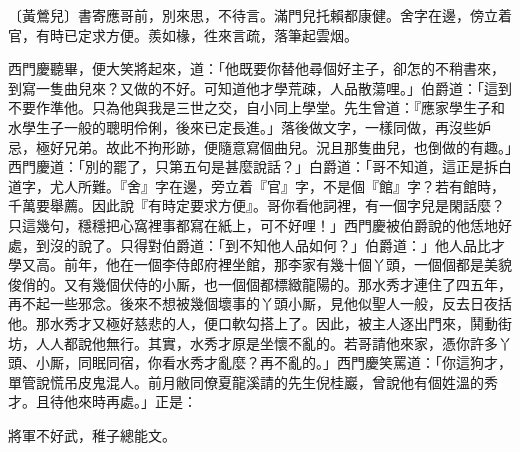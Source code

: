 \begin{myquote}
{\markfont\small〔黃鶯兒〕}書寄應哥前，別來思，不待言。滿門兒托賴都康健。舍字在邊，傍立着官，有時已定求方便。羨如椽，徃來言疏，落筆起雲烟。
\end{myquote}

西門慶聽畢，便大笑將起來，道：「他既要你替他尋個好主子，卻怎的不稍書來，到寫一隻曲兒來？又做的不好。可知道他才學荒疎，人品散蕩哩。」伯爵道：「這到不要作準他。只為他與我是三世之交，自小同上學堂。先生曾道：『應家學生子和水學生子一般的聰明伶俐，後來已定長進。」落後做文字，一樣同做，再沒些妒忌，極好兄弟。故此不拘形跡，{}便隨意寫個曲兒。況且那隻曲兒，也倒做的有趣。」西門慶道：「別的罷了，只第五句是甚麼說話？」白爵道：「哥不知道，這正是拆白道字，尤人所難。『舍』字在邊，旁立着『官』字，不是個『館』字？若有館時，千萬要舉薦。因此說『有時定要求方便』。哥你看他詞裡，有一個字兒是閑話麼？只這幾句，穩穩把心窩裡事都寫在紙上，可不好哩！」西門慶被伯爵說的他恁地好處，到沒的說了。只得對伯爵道：「到不知他人品如何？」伯爵道：」他人品比才學又高。前年，他在一個李侍郎府裡坐館，那李家有幾十個丫頭，一個個都是美貌俊俏的。又有幾個伏侍的小厮，也一個個都標緻龍陽的。那水秀才連住了四五年，再不起一些邪念。後來不想被幾個壞事的丫頭小厮，見他似聖人一般，反去日夜括他。那水秀才又極好慈悲的人，便口軟勾搭上了。{}因此，被主人逐出門來，鬨動街坊，人人都說他無行。其實，水秀才原是坐懷不亂的。若哥請他來家，憑你許多丫頭、小厮，同眠同宿，你看水秀才亂麼？再不亂的。」西門慶笑罵道：「你這狗才，單管說慌吊皮鬼混人。前月敝同僚夏龍溪請的先生倪桂巖，曾說他有個姓溫的秀才。且待他來時再處。」正是：

\begin{myquote}
將軍不好武，稚子總能文。
\end{myquote}


